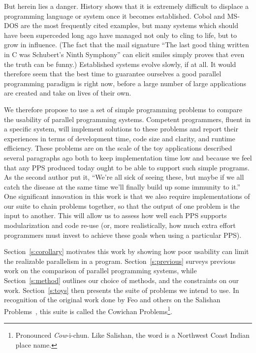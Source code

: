 But herein lies a danger.
History shows that it is extremely difficult
to displace a programming language or system once it becomes established.
Cobol and MS-DOS are the most frequently cited examples,
but many systems which should have been superceded long ago have managed
not only to cling to life,
but to grow in influence.
(The fact that the mail signature
``The last good thing written in C was Schubert's Ninth Symphony''
can elicit smiles simply proves that even the truth can be funny.)
Established systems evolve slowly, if at all.
It would therefore seem that the best time to guarantee ourselves
a good parallel programming paradigm is right now,
before a large number of large applications are created and take on lives of their own.

We therefore propose to use a set of simple programming problems to compare
the usability of parallel programming systems.
Competent programmers, fluent in a specific system,
will implement solutions to these problems and report their experiences
in terms of development time, code size and clarity, and runtime efficiency.
These problems are on the scale of the toy applications described several paragraphs ago
both to keep implementation time low
and because we feel that any PPS produced today ought to be able to support such simple programs.
As the second author put it,
``We're all sick of seeing these,
but maybe if we all catch the disease at the same time we'll finally build up some immunity to it.''
One significant innovation in this work is that
we also require implementations of our suite to chain problems together,
so that the output of one problem is the input to another.
This will allow us to assess how well each PPS supports modularization and code re-use
(or, more realistically, how much extra effort programmers must invest
to achieve these goals when using a particular PPS).

Section~\ref{s:corollary} motivates this work by showing
how poor usability can limit the realizable parallelism in a program.
Section~\ref{s:previous} surveys previous work on the comparison of parallel programming systems,
while Section~\ref{s:method} outlines our choice of methods, and the constraints on our work.
Section~\ref{s:toys} then presents the suite of problems we intend to use.
In recognition of the original work done by Feo and others on
the Salishan Problems~\cite{b:salishan}, this suite is called
the Cowichan Problems\footnote{\noindent Pronounced {\em{Cow}\/}-i-chun.
	Like Salishan, the word is a Northwest Coast Indian place name.}.


